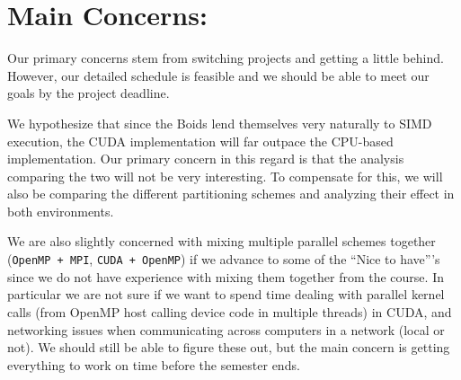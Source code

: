 \documentclass[12pt]{article}
\begin{document}
\section*{Main Concerns:} 
\par Our primary concerns stem from switching projects and getting a little behind. However, our detailed schedule is feasible and we should be able to meet our goals by the project deadline. 
\par We hypothesize that since the Boids lend themselves very naturally to SIMD execution, the CUDA implementation will far outpace the CPU-based implementation. Our primary concern in this regard is that the analysis comparing the two will not be very interesting. To compensate for this, we will also be comparing the different partitioning schemes and analyzing their effect in both environments.
\par We are also slightly concerned with mixing multiple parallel schemes together (\texttt{OpenMP + MPI}, \texttt{CUDA + OpenMP}) if we advance to some of the ``Nice to have'''s since we do not have experience with mixing them together from the course. In particular we are not sure if we want to spend time dealing with parallel kernel calls (from OpenMP host calling device code in multiple threads) in CUDA, and networking issues when communicating across computers in a network (local or not). We should still be able to figure these out, but the main concern is getting everything to work on time before the semester ends. 
\end{document}
